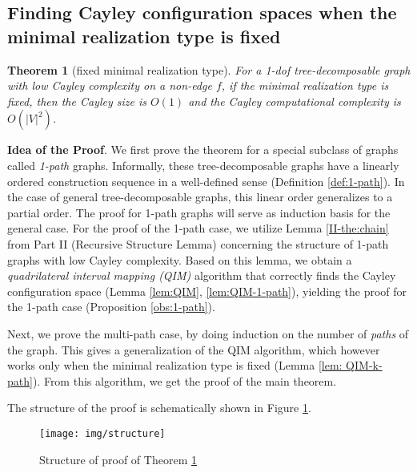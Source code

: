 \documentclass[secthm,amsthm,english]{article}
\newtheorem{theorem}{Theorem}
\theoremstyle{definition}
\theoremstyle{remark}
\begin{document}
\subsection{Finding Cayley configuration spaces when the minimal realization type is fixed}

\begin{theorem}[fixed minimal realization type]\label{obs:k-path}
For a 1-dof tree-decomposable graph with low Cayley complexity on a non-edge $f$, 
if the minimal realization type is fixed, then
the Cayley size is $O(1)$ and the Cayley computational complexity is $O(|V|^2)$. 
\end{theorem}


\noindent \textbf{Idea of the Proof}. 
We first prove the theorem for a special subclass of graphs called \emph{1-path} graphs. 
Informally, these tree-decomposable graphs have a linearly ordered construction sequence in a well-defined sense (Definition \ref{def:1-path}). 
In the case of general tree-decomposable graphs, this linear order generalizes to a partial order. 
The proof for 1-path graphs will serve as induction basis for the general case. 
For the proof of the 1-path case, we utilize Lemma \ref{II-the:chain} from Part II (Recursive Structure Lemma) concerning the structure of 1-path graphs with low Cayley complexity. 
Based on this lemma, we obtain a \emph{quadrilateral interval mapping (QIM)} algorithm that correctly finds the Cayley configuration space (Lemma \ref{lem:QIM}, \ref{lem:QIM-1-path}), yielding the proof for the 1-path case (Proposition \ref{obs:1-path}).

Next, we prove the multi-path case, by doing induction on the number of \emph{paths} of the graph. 
This gives a generalization of the QIM algorithm, which however works only when the minimal realization type is fixed (Lemma \ref{lem: QIM-k-path}). 
From this algorithm, we get the proof of the main theorem. 

The structure of the proof is schematically shown in Figure \ref{F:structure}. 



\begin{figure}[h] 
	  
  
	
	\begin{centering}
	\texttt{[image: img/structure]} 
	\par\end{centering}
	
	\caption{Structure of proof of Theorem \ref{obs:k-path}}
	
\label{F:structure}
\end{figure}
\end{document}
